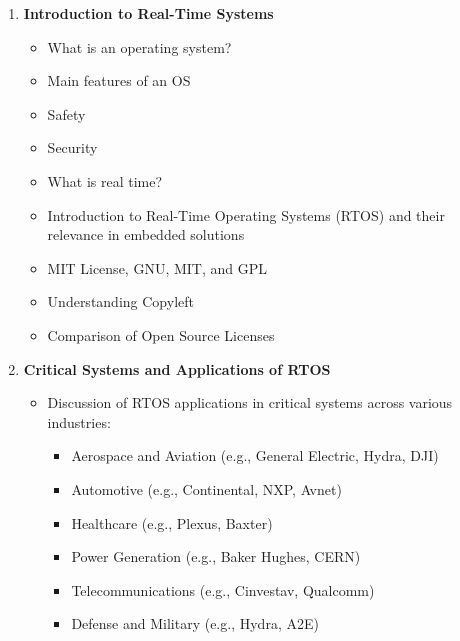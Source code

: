 \begin{enumerate}[label=\textbf{Week \arabic*:}]
    \item \textbf{Introduction to Real-Time Systems}
    \begin{itemize}
        \item What is an operating system?
        \item Main features of an OS
        \item Safety
        \item Security
        \item What is real time?
        \item Introduction to Real-Time Operating Systems (RTOS) and their relevance in embedded solutions
        \item MIT License, GNU, MIT, and GPL
        \item Understanding Copyleft
        \item Comparison of Open Source Licenses
    \end{itemize}

    \item \textbf{Critical Systems and Applications of RTOS}
    \begin{itemize}
        \item Discussion of RTOS applications in critical systems across various industries:
        \begin{itemize}
            \item Aerospace and Aviation (e.g., General Electric, Hydra, DJI)
            \item Automotive (e.g., Continental, NXP, Avnet)
            \item Healthcare (e.g., Plexus, Baxter)
            \item Power Generation (e.g., Baker Hughes, CERN)
            \item Telecommunications (e.g., Cinvestav, Qualcomm)
            \item Defense and Military (e.g., Hydra, A2E)
        \end{itemize}
    \end{itemize}


\end{enumerate}
